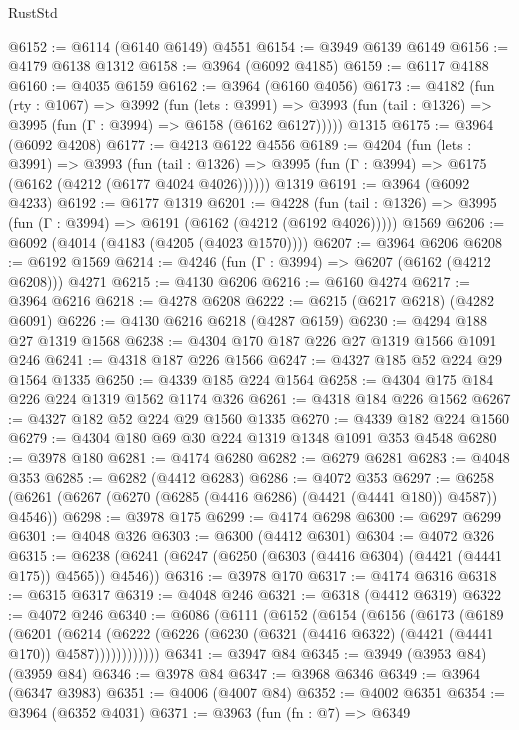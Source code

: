 \begin{lexlean}{RustStd}
\begin{coremodule}
@6152 := @6114 (@6140 @6149) @4551
@6154 := @3949 @6139 @6149
@6156 := @4179 @6138 @1312
@6158 := @3964 (@6092 @4185)
@6159 := @6117 @4188
@6160 := @4035 @6159
@6162 := @3964 (@6160 @4056)
@6173 := @4182
    (fun (rty : @1067) =>
    @3992
      (fun (lets : @3991) =>
      @3993 (fun (tail : @1326) => @3995 (fun (Γ : @3994) => @6158 (@6162 @6127)))))
    @1315
@6175 := @3964 (@6092 @4208)
@6177 := @4213 @6122 @4556
@6189 := @4204
    (fun (lets : @3991) =>
    @3993
      (fun (tail : @1326) => @3995 (fun (Γ : @3994) => @6175 (@6162 (@4212 (@6177 @4024 @4026))))))
    @1319
@6191 := @3964 (@6092 @4233)
@6192 := @6177 @1319
@6201 := @4228
    (fun (tail : @1326) => @3995 (fun (Γ : @3994) => @6191 (@6162 (@4212 (@6192 @4026)))))
    @1569
@6206 := @6092 (@4014 (@4183 (@4205 (@4023 @1570))))
@6207 := @3964 @6206
@6208 := @6192 @1569
@6214 := @4246 (fun (Γ : @3994) => @6207 (@6162 (@4212 @6208))) @4271
@6215 := @4130 @6206
@6216 := @6160 @4274
@6217 := @3964 @6216
@6218 := @4278 @6208
@6222 := @6215 (@6217 @6218) (@4282 @6091)
@6226 := @4130 @6216 @6218 (@4287 @6159)
@6230 := @4294 @188 @27 @1319 @1568
@6238 := @4304 @170 @187 @226 @27 @1319 @1566 @1091 @246
@6241 := @4318 @187 @226 @1566
@6247 := @4327 @185 @52 @224 @29 @1564 @1335
@6250 := @4339 @185 @224 @1564
@6258 := @4304 @175 @184 @226 @224 @1319 @1562 @1174 @326
@6261 := @4318 @184 @226 @1562
@6267 := @4327 @182 @52 @224 @29 @1560 @1335
@6270 := @4339 @182 @224 @1560
@6279 := @4304 @180 @69 @30 @224 @1319 @1348 @1091 @353 @4548
@6280 := @3978 @180
@6281 := @4174 @6280
@6282 := @6279 @6281
@6283 := @4048 @353
@6285 := @6282 (@4412 @6283)
@6286 := @4072 @353
@6297 := @6258 (@6261 (@6267 (@6270 (@6285 (@4416 @6286) (@4421 (@4441 @180)) @4587)) @4546))
@6298 := @3978 @175
@6299 := @4174 @6298
@6300 := @6297 @6299
@6301 := @4048 @326
@6303 := @6300 (@4412 @6301)
@6304 := @4072 @326
@6315 := @6238 (@6241 (@6247 (@6250 (@6303 (@4416 @6304) (@4421 (@4441 @175)) @4565)) @4546))
@6316 := @3978 @170
@6317 := @4174 @6316
@6318 := @6315 @6317
@6319 := @4048 @246
@6321 := @6318 (@4412 @6319)
@6322 := @4072 @246
@6340 := @6086
    (@6111
      (@6152
        (@6154
          (@6156
            (@6173
              (@6189
                (@6201
                  (@6214
                    (@6222 (@6226 (@6230 (@6321 (@4416 @6322) (@4421 (@4441 @170)) @4587))))))))))))
@6341 := @3947 @84
@6345 := @3949 (@3953 @84) (@3959 @84)
@6346 := @3978 @84
@6347 := @3968 @6346
@6349 := @3964 (@6347 @3983)
@6351 := @4006 (@4007 @84)
@6352 := @4002 @6351
@6354 := @3964 (@6352 @4031)
@6371 := @3963
    (fun (fn : @7) =>
    @6349

\end{coremodule}
\end{lexlean}
